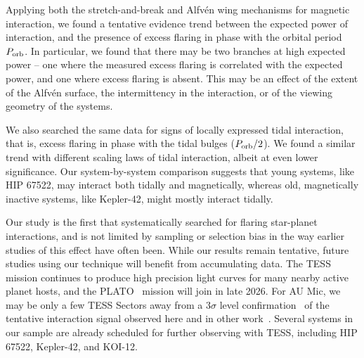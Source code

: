 \documentclass[twocolumn]{aastex631}
\begin{document}
Applying both the stretch-and-break and Alfv\'en wing mechanisms for magnetic interaction, we found a tentative evidence trend between the expected power of interaction, and the presence of excess flaring in phase with the orbital period $P_{\rm orb}$. In particular, we found that there may be two branches at high expected power -- one where the measured excess flaring is correlated with the expected power, and one where excess flaring is absent. This may be an effect of the extent of the Alfv\'en surface, the intermittency in the interaction, or of the viewing geometry of the systems.

We also searched the same data for signs of locally expressed tidal interaction, that is, excess flaring in phase with the tidal bulges ($P_{\rm orb}/2$). We found a similar trend with different scaling laws of tidal interaction, albeit at even lower significance. Our system-by-system comparison suggests that young systems, like HIP 67522, may interact both tidally and magnetically, whereas old, magnetically inactive systems, like Kepler-42, might mostly interact tidally. 

Our study is the first that systematically searched for flaring star-planet interactions, and is not limited by sampling or selection bias in the way earlier studies of this effect have often been. While our results remain tentative, future studies using our technique will benefit from accumulating data. The TESS mission continues to produce high precision light curves for many nearby active planet hosts, and the PLATO~\citep{rauer2014plato} mission will join in late 2026. For AU Mic, we may be only a few TESS Sectors away from a $3\sigma$ level confirmation~\citep{ilin2022searching} of the tentative interaction signal observed here and in other work~\citep{klein2022one}. Several systems in our sample are already scheduled for further observing with TESS, including HIP 67522, Kepler-42, and KOI-12.

\end{document}
